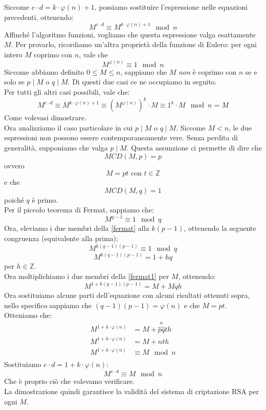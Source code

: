 \documentclass[italian,A4,12pt]{article}
\begin{document}
      Siccome $e\cdot d=k\cdot \varphi(n)+1$, possiamo sostituire l'espressione nelle equazioni precedenti, ottenendo:
      $$M^{e\cdot d}\equiv M^{k\cdot \varphi(n)+1} \mod{n}$$
      Affinché l'algoritmo funzioni, vogliamo che questa espressione valga esattamente $M$. Per provarlo, ricordiamo un'altra proprietà della funzione di Eulero: per ogni intero $M$ coprimo con $n$, vale che
      $$M^{\varphi(n)}\equiv 1 \mod{n}$$
      Siccome abbiamo definito $0\leq M \leq n$, sappiamo che $M$ \textit{non} è coprimo con $n$ se e solo se $p\mid M$ o $q\mid M$. Di questi due casi ce ne occupiamo in seguito.\\
      Per tutti gli altri casi possibili, vale che:
      $$M^{e\cdot d}\equiv M^{k\cdot \varphi(n)+1}\equiv \left(M^{\varphi(n)}\right)^k\cdot M \equiv 1^k\cdot M \mod{n}=M$$
      Come volevasi dimostrare.\\
      Ora analizziamo il caso particolare in cui $p\mid M$ o $q\mid M$. Siccome $M<n$, le due espressioni non possono essere contemporaneamente vere. Senza perdita di generalità, supponiamo che valga $p\mid M$.
      Questa assunzione ci permette di dire che
      $$MCD(M,p)=p$$
      ovvero
      $$M=pt\text{ con }t\in\mathbb{Z}$$
      e che
      $$MCD(M,q)=1$$
      poiché $q$ è primo.\\
      Per il piccolo teorema di Fermat, sappiamo che:
      \begin{equation}
        M^{q-1}\equiv 1 \mod{q} \label{fermat}
      \end{equation}
      Ora, eleviamo i due membri della \eqref{fermat} alla $k(p-1)$, ottenendo la seguente congruenza (equivalente alla prima):
      $$M^{k(q-1)(p-1)}\equiv 1 \mod{q}$$
      \begin{equation}
          M^{k(q-1)(p-1)}=1+hq \label{fermat1}
      \end{equation}
      per $h\in\mathbb{Z}$.\\
      Ora moltiplichiamo i due membri della \eqref{fermat1} per $M$, ottenendo:
      $$M^{1+k(q-1)(p-1)}=M+Mqh$$
      Ora sostituiamo alcune parti dell'equazione con alcuni risultati ottenuti sopra, nello specifico sappiamo che $(q-1)(p-1)=\varphi(n)$ e che $M=pt$. Otteniamo che:
      \begin{align*}
        M^{1+k\cdot \varphi(n)}&=M+\overbrace{pq}^{n}th\\
        M^{1+k\cdot \varphi(n)}&=M+nth\\
        M^{1+k\cdot \varphi(n)}&\equiv M \mod{n}\\
      \end{align*}
      Sostituiamo $e\cdot d=1+k\cdot \varphi(n)$:
      $$M^{e\cdot d}\equiv M \mod{n}$$
      Che è proprio ciò che volevamo verificare.\\
      La dimostrazione quindi garantisce la validità del sistema di criptazione RSA per ogni $M$.
\end{document}
